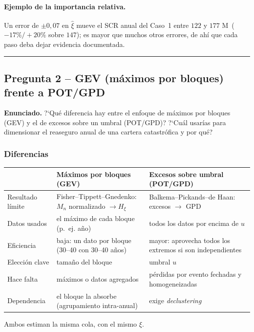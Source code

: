 \documentclass[a4paper,12pt]{article}
\newcommand{\euro}{\texteuro}
\begin{document}
\paragraph{Ejemplo de la importancia relativa.} Un error de $\pm0{,}07$ en $\hat\xi$ mueve el SCR anual del Caso~1 entre $122$ y $177$ M\euro\ ($-17\%/+20\%$ sobre $147$); es mayor que muchos otros errores, de ah\'i que cada paso deba dejar evidencia documentada.

\bigskip\hrule\bigskip

\subsection{Pregunta 2 -- GEV (m\'aximos por bloques) frente a POT/GPD}

\noindent\textbf{Enunciado.} ?`Qu\'e diferencia hay entre el enfoque de m\'aximos por bloques (GEV) y el de excesos sobre un umbral (POT/GPD)? ?`Cu\'al usar\'ias para dimensionar el reaseguro anual de una cartera catastr\'ofica y por qu\'e?

\subsubsection*{Diferencias}
\begin{center}
\small
\begin{tabular}{p{3.2cm}p{5.8cm}p{5.8cm}}
\toprule
 & M\'aximos por bloques (GEV) & Excesos sobre umbral (POT/GPD)\\
\midrule
Resultado l\'imite & Fisher--Tippett--Gnedenko: $M_n$ normalizado $\to H_\xi$ & Balkema--Pickands--de Haan: excesos $\to$ GPD\\
Datos usados & el m\'aximo de cada bloque (p.~ej. a\~no) & todos los datos por encima de $u$\\
Eficiencia & baja: un dato por bloque (30--40 con 30--40 a\~nos) & mayor: aprovecha todos los extremos si son independientes\\
Elecci\'on clave & tama\~no del bloque & umbral $u$\\
Hace falta & m\'aximos o datos agregados & pérdidas por evento fechadas y homogeneizadas\\
Dependencia & el bloque la absorbe (agrupamiento intra-anual) & exige \emph{declustering}\\
\bottomrule
\end{tabular}
\end{center}
Ambos estiman la misma cola, con el mismo $\xi$.
\end{document}
